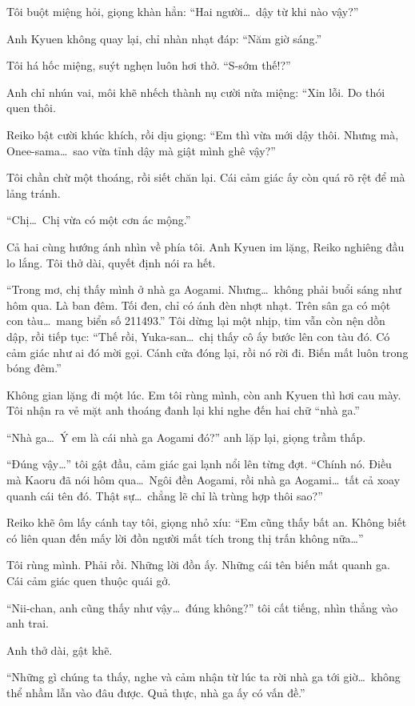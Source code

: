 \documentclass[../main.tex]{subfiles}
\begin{document}
Tôi buột miệng hỏi, giọng khàn hẳn: ``Hai người\dots\ dậy từ khi nào vậy?''

Anh Kyuen không quay lại, chỉ nhàn nhạt đáp: ``Năm giờ sáng.''

Tôi há hốc miệng, suýt nghẹn luôn hơi thở. ``S-sớm thế!?''

Anh chỉ nhún vai, môi khẽ nhếch thành nụ cười nửa miệng: ``Xin lỗi. Do thói quen thôi.

Reiko bật cười khúc khích, rồi dịu giọng: ``Em thì vừa mới dậy thôi. Nhưng mà, Onee-sama\dots\ sao vừa tỉnh dậy mà giật mình ghê vậy?''

Tôi chần chừ một thoáng, rồi siết chăn lại. Cái cảm giác ấy còn quá rõ rệt để mà lảng tránh.

``Chị\dots\ Chị vừa có một cơn ác mộng.''

Cả hai cùng hướng ánh nhìn về phía tôi. Anh Kyuen im lặng, Reiko nghiêng đầu lo lắng. Tôi thở dài, quyết định nói ra hết.

``Trong mơ, chị thấy mình ở nhà ga Aogami. Nhưng\dots\ không phải buổi sáng như hôm qua. Là ban đêm. Tối đen, chỉ có ánh đèn nhợt nhạt. Trên sân ga có một con tàu\dots\ mang biển số 211493.'' Tôi dừng lại một nhịp, tim vẫn còn nện dồn dập, rồi tiếp tục: ``Thế rồi, Yuka-san\dots\ chị thấy cô ấy bước lên con tàu đó. Có cảm giác như ai đó mời gọi. Cánh cửa đóng lại, rồi nó rời đi. Biến mất luôn trong bóng đêm.''

Không gian lặng đi một lúc. Em tôi rùng mình, còn anh Kyuen thì hơi cau mày. Tôi nhận ra vẻ mặt anh thoáng đanh lại khi nghe đến hai chữ ``nhà ga.''

``Nhà ga\dots\ Ý em là cái nhà ga Aogami đó?'' anh lặp lại, giọng trầm thấp.

``Đúng vậy\dots'' tôi gật đầu, cảm giác gai lạnh nổi lên từng đợt. ``Chính nó. Điều mà Kaoru đã nói hôm qua\dots\ Ngôi đền Aogami, rồi nhà ga Aogami\dots\ tất cả xoay quanh cái tên đó. Thật sự\dots\ chẳng lẽ chỉ là trùng hợp thôi sao?''

Reiko khẽ ôm lấy cánh tay tôi, giọng nhỏ xíu: ``Em cũng thấy bất an. Không biết có liên quan đến mấy lời đồn người mất tích trong thị trấn không nữa\dots''

Tôi rùng mình. Phải rồi. Những lời đồn ấy. Những cái tên biến mất quanh ga. Cái cảm giác quen thuộc quái gở.

``Nii-chan, anh cũng thấy như vậy\dots\ đúng không?'' tôi cất tiếng, nhìn thẳng vào anh trai.

Anh thở dài, gật khẽ.

``Những gì chúng ta thấy, nghe và cảm nhận từ lúc ta rời nhà ga tới giờ\dots\ không thể nhầm lẫn vào đâu được. Quả thực, nhà ga ấy có vấn đề.''
\end{document}
